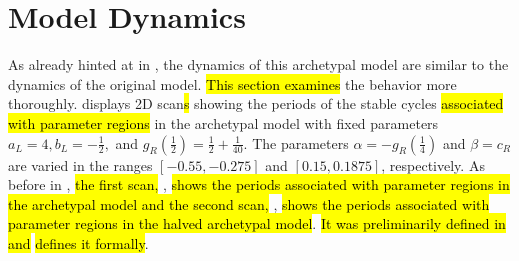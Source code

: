 \section{Model Dynamics}
\label{sec:arch.dynamics}

As already hinted at in , the dynamics of this archetypal model are similar to the dynamics of the original model.
\hl{This section examines} the behavior more thoroughly.
 displays 2D scan\hl{s} showing the periods of the stable cycles \hl{associated with parameter regions} in the archetypal model with fixed parameters $a_L = 4, b_L = -\frac{1}{2},$ and $g_R\left(\frac{1}{2}\right) = \frac{1}{2} + \frac{1}{40}$.
The parameters $\alpha = -g_R\left(\frac{1}{4}\right)$ and $\beta = c_R$ are varied in the ranges $[-0.55, -0.275]$ and $[0.15, 0.1875]$, respectively.
As before in , \hl{the first scan,} , \hl{shows the periods associated with parameter regions in the archetypal model and the second scan,} , \hl{shows the periods associated with parameter regions in the halved archetypal model}.
\hl{It was preliminarily defined in}  \hl{and}  \hl{defines it formally}.

